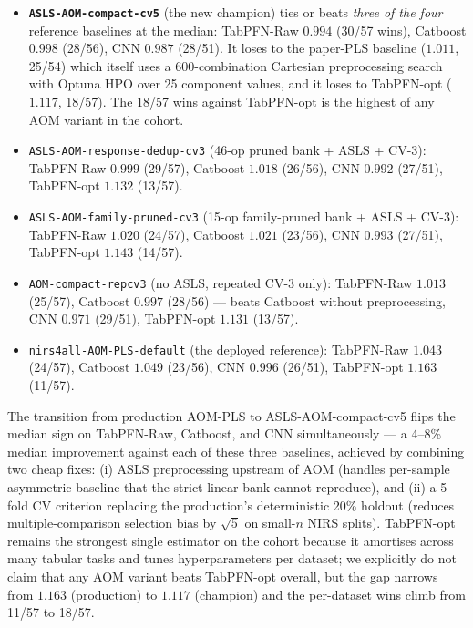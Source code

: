 \documentclass[review,a4paper]{elsarticle}
\newcommand{\AOM}{\textsc{AOM}\xspace}
\begin{document}
\begin{itemize}[leftmargin=2em,itemsep=0pt]
  \item \textbf{\texttt{ASLS-AOM-compact-cv5}} (the new champion)
        ties or beats \emph{three of the four} reference baselines at
        the median: TabPFN-Raw $0.994$ (30/57 wins), Catboost $0.998$
        (28/56), CNN $0.987$ (28/51). It loses to the paper-PLS
        baseline ($1.011$, 25/54) which itself uses a 600-combination
        Cartesian preprocessing search with Optuna HPO over 25
        component values, and it loses to TabPFN-opt ($1.117$,
        18/57). The 18/57 wins against TabPFN-opt is the highest of
        any \AOM variant in the cohort.
  \item \texttt{ASLS-AOM-response-dedup-cv3} (46-op pruned bank +
        ASLS + CV-3): TabPFN-Raw $0.999$ (29/57), Catboost $1.018$
        (26/56), CNN $0.992$ (27/51), TabPFN-opt $1.132$ (13/57).
  \item \texttt{ASLS-AOM-family-pruned-cv3} (15-op family-pruned bank
        + ASLS + CV-3): TabPFN-Raw $1.020$ (24/57), Catboost $1.021$
        (23/56), CNN $0.993$ (27/51), TabPFN-opt $1.143$ (14/57).
  \item \texttt{AOM-compact-repcv3} (no ASLS, repeated CV-3 only):
        TabPFN-Raw $1.013$ (25/57), Catboost $0.997$ (28/56) ---
        beats Catboost without preprocessing, CNN $0.971$ (29/51),
        TabPFN-opt $1.131$ (13/57).
  \item \texttt{nirs4all-AOM-PLS-default} (the deployed reference):
        TabPFN-Raw $1.043$ (24/57), Catboost $1.049$ (23/56), CNN
        $0.996$ (26/51), TabPFN-opt $1.163$ (11/57).
\end{itemize}

The transition from production AOM-PLS to ASLS-AOM-compact-cv5
flips the median sign on TabPFN-Raw, Catboost, and CNN
simultaneously --- a 4--8\% median improvement against each of these
three baselines, achieved by combining two cheap fixes: (i) ASLS
preprocessing upstream of AOM (handles per-sample asymmetric baseline
that the strict-linear bank cannot reproduce), and (ii) a 5-fold CV
criterion replacing the production's deterministic 20\% holdout
(reduces multiple-comparison selection bias by $\sqrt{5}$ on
small-$n$ NIRS splits). TabPFN-opt remains the strongest single
estimator on the cohort because it amortises across many tabular
tasks and tunes hyperparameters per dataset; we explicitly do not
claim that any \AOM variant beats TabPFN-opt overall, but the gap
narrows from $1.163$ (production) to $1.117$ (champion) and the
per-dataset wins climb from 11/57 to 18/57.
\end{document}
